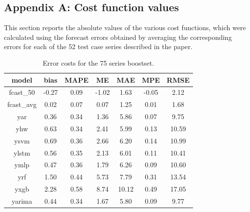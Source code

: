 \documentclass[mnsc,sglanonrev]{informs4}  %
\theoremstyle{remark}\newtheorem{remark}{Remark}
\begin{document}
\begin{APPENDICES}
\vspace*{-10pt}
\section{Appendix A: Cost function values} \label{app:errcost}

This section reports the absolute values of the various cost functions, which were calculated using the forecast errors obtained by averaging the corresponding errors for each of the 52 test case series described in the paper.

\begin{table}[h]
	\centering
	\renewcommand{\arraystretch}{1.0}
	\begin{tabular}{ccccccc}
		model & bias & MAPE & ME & MAE & MPE & RMSE \\
		\hline
		fcast\_50   &-0.27 & 0.09 &-1.02 & 1.63 &-0.05 &  2.12 \\
		fcast\_avg  & 0.02 & 0.07 & 0.07 & 1.25 & 0.01 &  1.68 \\
		yar         & 0.36 & 0.34 & 1.36 & 5.86 & 0.07 &  9.75 \\
		yhw         & 0.63 & 0.34 & 2.41 & 5.99 & 0.13 & 10.59 \\
		ysvm        & 0.69 & 0.36 & 2.66 & 6.20 & 0.14 & 10.99 \\
		ylstm       & 0.56 & 0.35 & 2.13 & 6.01 & 0.11 & 10.41 \\
		ymlp        & 0.47 & 0.36 & 1.79 & 6.26 & 0.09 & 10.60 \\
		yrf         & 1.50 & 0.44 & 5.73 & 7.79 & 0.31 & 13.54 \\
		yxgb        & 2.28 & 0.58 & 8.74 &10.12 & 0.49 & 17.05 \\
		yarima      & 0.44 & 0.34 & 1.67 & 5.80 & 0.09 &  9.77 \\
		\hline
	\end{tabular}
	\caption{Error costs for the 75 series boostset.}
	\label{table:app75}
\end{table}


\end{APPENDICES}
\end{document}
